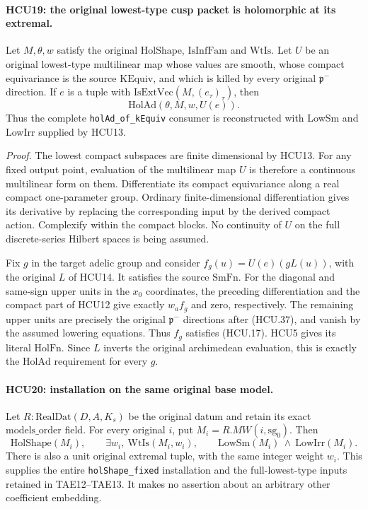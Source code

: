 \paragraph{HCU19: the original lowest-type cusp packet is holomorphic at its extremal.}
\label{claim:HCU19}
Let \(M,\theta,w\) satisfy the original
\(\mathrm{HolShape}\), \(\mathrm{IsInfFam}\) and \(\mathrm{WtIs}\).
Let \(U\) be an original lowest-type multilinear map whose values
are smooth, whose compact equivariance is the source
\(\mathrm{KEquiv}\), and which is killed by every original
\(\mathfrak p^-\) direction.
If \(e\) is a tuple with
\(\mathrm{IsExtVec}(M,(e_\tau)_\tau)\), then
\[
 \mathrm{HolAd}(\theta,M,w,U(e)).
 \tag{HCU.53}
\]
Thus the complete \texttt{holAd\_of\_kEquiv} consumer is reconstructed
with LowSm and LowIrr supplied by HCU13.

\emph{Proof.}
The lowest compact subspaces are finite dimensional by HCU13.
For any fixed output point, evaluation of the multilinear map \(U\)
is therefore a continuous multilinear form on them.
Differentiate its compact equivariance along a real compact
one-parameter group.  Ordinary finite-dimensional differentiation
gives its derivative by replacing the corresponding input by the
derived compact action.  Complexify within the compact blocks.
No continuity of \(U\) on the full discrete-series Hilbert spaces
is being assumed.

Fix \(g\) in the target adelic group and consider
\(f_g(u)=U(e)(gL(u))\), with the original \(L\) of HCU14.
It satisfies the source \(\mathrm{SmFn}\).
For the diagonal and same-sign upper units in the \(x_0\) coordinates,
the preceding differentiation and the compact part of HCU12 give
exactly \(w_a f_g\) and zero, respectively.
The remaining upper units are precisely the original
\(\mathfrak p^-\) directions after (HCU.37), and vanish by the
assumed lowering equations.
Thus \(f_g\) satisfies (HCU.17).  HCU5 gives its literal
\(\mathrm{HolFn}\).
Since \(L\) inverts the original archimedean evaluation, this is
exactly the \(\mathrm{HolAd}\) requirement for every \(g\).

\paragraph{HCU20: installation on the same original base model.}
\label{claim:HCU20}
Let \(R:\mathrm{RealDat}(D,A,K_s)\) be the original datum and retain
its exact \(\mathrm{models\_order}\) field.  For every original \(i\),
put \(M_i=R.MW(i,\mathrm{sg}_0)\).  Then
\[
 \mathrm{HolShape}(M_i),\qquad
 \exists w_i,\ \mathrm{WtIs}(M_i,w_i),\qquad
 \mathrm{LowSm}(M_i)\ \wedge\ \mathrm{LowIrr}(M_i).
 \tag{HCU.54}
\]
There is also a unit original extremal tuple, with the same integer
weight \(w_i\).  This supplies the entire
\texttt{holShape\_fixed} installation and the full-lowest-type inputs
retained in TAE12--TAE13.  It makes no assertion about an arbitrary
other coefficient embedding.

